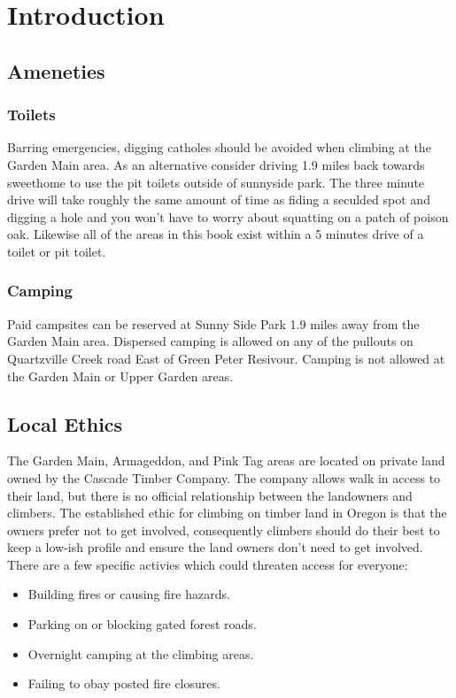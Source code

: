 \chapter{Introduction}
\lhead{\textcolor{\chapterColor}{\rule[-2pt]{\textwidth}{15pt}}}
\section{Ameneties}
\subsection*{Toilets}
Barring emergencies, digging catholes should be avoided when climbing at the Garden Main area. As an alternative consider driving 1.9 miles back towards sweethome to use the pit toilets outside of sunnyside park. The three minute drive will take roughly the same amount of time as fiding a seculded spot and digging a hole and you won't have to worry about squatting on a patch of poison oak. Likewise all of the areas in this book exist within a 5 minutes drive of a toilet or pit toilet. 
\subsection*{Camping}
Paid campsites can be reserved at Sunny Side Park 1.9 miles away from the Garden Main area. Dispersed camping is allowed on any of the pullouts on Quartzville Creek road East of Green Peter Resivour. Camping is not allowed at the Garden Main or Upper Garden areas.
\section{Local Ethics}
The Garden Main, Armageddon, and Pink Tag areas are located on private land owned by the Cascade Timber Company. The company allows walk in access to their land, but there is no official relationship between the landowners and climbers. The established ethic for climbing on timber land in Oregon is that the owners prefer not to get involved, consequently climbers should do their best to keep a low-ish profile and ensure the land owners don't need to get involved. There are a few specific activies which could threaten access for everyone:\\
\begin{itemize}
\item Building fires or causing fire hazards.\\
\item Parking on or blocking gated forest roads.\\
\item Overnight camping at the climbing areas.\\
\item Failing to obay posted fire closures.\\
\end{itemize}
